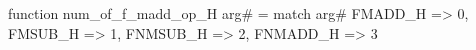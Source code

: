 function num_of_f_madd_op_H arg# = match arg# {
  FMADD_H => 0,
  FMSUB_H => 1,
  FNMSUB_H => 2,
  FNMADD_H => 3
}
